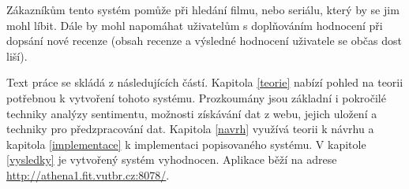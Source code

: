 Zákazníkům tento systém pomůže při hledání filmu, nebo seriálu, který by se jim mohl líbit. Dále by mohl napomáhat uživatelům s doplňováním  hodnocení při dopsání nové recenze (obsah recenze a výsledné hodnocení uživatele se občas dost liší).  

Text práce se skládá z následujících částí. Kapitola \ref{teorie} nabízí pohled na teorii potřebnou k vytvoření tohoto systému. Prozkoumány jsou základní i pokročilé techniky analýzy sentimentu, možnosti získávání dat z webu, jejich uložení a techniky pro předzpracování dat. Kapitola \ref{navrh} využívá teorii k návrhu a kapitola \ref{implementace} k implementaci popisovaného systému. V kapitole \ref{vysledky} je vytvořený systém vyhodnocen. Aplikace běží na adrese \url{http://athena1.fit.vutbr.cz:8078/}.